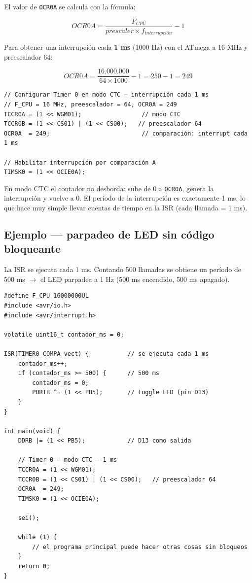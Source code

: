 El valor de \texttt{OCR0A} se calcula con la fórmula:

$$OCR0A = \frac{F_{CPU}}{prescaler \times f_{interrupción}} - 1$$

Para obtener una interrupción cada \textbf{1 ms} (1000 Hz) con el ATmega a 16 MHz y
preescalador 64:

$$OCR0A = \frac{16.000.000}{64 \times 1000} - 1 = 250 - 1 = 249$$

\begin{lstlisting}[style=estilo-c]
// Configurar Timer 0 en modo CTC — interrupción cada 1 ms
// F_CPU = 16 MHz, preescalador = 64, OCR0A = 249
TCCR0A = (1 << WGM01);                 // modo CTC
TCCR0B = (1 << CS01) | (1 << CS00);   // preescalador 64
OCR0A  = 249;                          // comparación: interrupt cada 1 ms

// Habilitar interrupción por comparación A
TIMSK0 = (1 << OCIE0A);
\end{lstlisting}

En modo CTC el contador no desborda: sube de 0 a \texttt{OCR0A}, genera la
interrupción y vuelve a 0. El período de la interrupción es exactamente 1 ms, lo
que hace muy simple llevar cuentas de tiempo en la ISR (cada llamada = 1 ms).

\subsection{Ejemplo --- parpadeo de LED sin código bloqueante}

La ISR se ejecuta cada 1 ms. Contando 500 llamadas se obtiene un período de 500 ms
$\rightarrow$ el LED parpadea a 1 Hz (500 ms encendido, 500 ms apagado).

\begin{lstlisting}[style=estilo-c]
#define F_CPU 16000000UL
#include <avr/io.h>
#include <avr/interrupt.h>

volatile uint16_t contador_ms = 0;

ISR(TIMER0_COMPA_vect) {           // se ejecuta cada 1 ms
    contador_ms++;
    if (contador_ms >= 500) {      // 500 ms
        contador_ms = 0;
        PORTB ^= (1 << PB5);       // toggle LED (pin D13)
    }
}

int main(void) {
    DDRB |= (1 << PB5);            // D13 como salida

    // Timer 0 — modo CTC — 1 ms
    TCCR0A = (1 << WGM01);
    TCCR0B = (1 << CS01) | (1 << CS00);   // preescalador 64
    OCR0A  = 249;
    TIMSK0 = (1 << OCIE0A);

    sei();

    while (1) {
        // el programa principal puede hacer otras cosas sin bloqueos
    }
    return 0;
}
\end{lstlisting}

